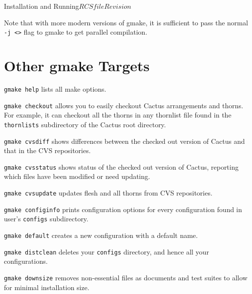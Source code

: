 \begin{cactuspart}{Installation and Running}{$RCSfile$}{$Revision$}
\begin{Lentry}
\end{Lentry}

Note that with more modern versions of gmake, it is sufficient to pass the
normal \texttt{-j <>} flag to gmake to get parallel compilation.





\section{Other gmake Targets}

\begin{Lentry}

\item [\texttt{gmake help}] lists all make options.

\item [\texttt{gmake checkout}] allows you to easily checkout Cactus
arrangements and thorns.  For example, it can checkout all the thorns
in any thornlist file found in the \texttt{thornlists} subdirectory of
the Cactus root directory. %

\item [\texttt{gmake cvsdiff}] shows differences between the checked out version of Cactus and that in the CVS repositories.

\item [\texttt{gmake cvsstatus}] shows status of the checked out version of Cactus, reporting which files have been modified or need updating.

\item [\texttt{gmake cvsupdate}] updates flesh and all thorns from CVS repositories.

\item [\texttt{gmake configinfo}] prints configuration options for every
configuration found in user's \texttt{configs} subdirectory.

\item [\texttt{gmake default}] creates a new configuration with a default name.

\item [\texttt{gmake distclean}] deletes your \texttt{configs} directory, and hence all your configurations.

\item [\texttt{gmake downsize}] removes non-essential files as documents
  and test suites to allow for minimal installation size.


\end{Lentry}
\end{cactuspart}
